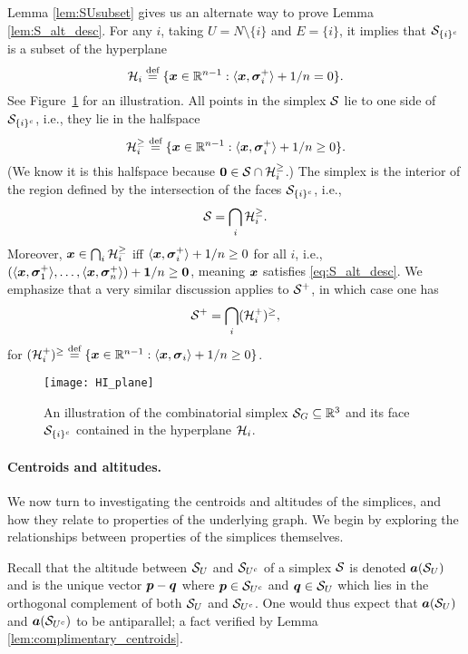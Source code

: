 Lemma \ref{lem:SUsubset} gives us an alternate way to prove Lemma \ref{lem:S_alt_desc}. For any $i$,  taking $U=N\setminus \{i\}$ and $E=\{i\}$, it implies that $\mathcal{S}_{\{i\}^c}$ is a subset of the hyperplane 
\begin{equation}
\label{eq:Hi}
 \mathcal{H}_i\overset{\text{def}}{=} \{\vb*{x}\in\mathbb{R}^{n-1}:\langle \vb*{x},\vb*{\sigma}_i^+\rangle+1/n=0\}.
\end{equation}
See Figure~\ref{fig:Hi_plane} for an illustration. 
All points in the simplex $\mathcal{S}$ lie to one side of $\mathcal{S}_{\{i\}^c}$, i.e., they lie in the halfspace 
\[\mathcal{H}_i^{\geq } \overset{\text{def}}{=} \{\vb*{x}\in\mathbb{R}^{n-1}:\langle \vb*{x},\vb*{\sigma}_i^+\rangle+1/n\geq0\}.\]
(We know it is this halfspace because $\vb{0}\in\mathcal{S}\cap\mathcal{H}_i^{\geq }$.) The simplex is the interior of the region defined by the intersection of the faces $\mathcal{S}_{\{i\}^c}$, i.e.,   
\begin{equation}
\label{eq:splx_bigcapH_i}
    \mathcal{S}=\bigcap_i \mathcal{H}_i^{\geq }.
\end{equation}
Moreover, $\vb*{x}\in \bigcap_i\mathcal{H}_i^{\geq }$ iff $\langle \vb*{x},\vb*{\sigma}_i^+\rangle +1/n\geq 0$ for all $i$, i.e., $(\langle \vb*{x},\vb*{\sigma}_1^+\rangle,\dots,\langle \vb*{x},\vb*{\sigma}_n^+\rangle) + \vb{1}/n\geq \vb{0}$, meaning $\vb*{x}$ satisfies \eqref{eq:S_alt_desc}.  We emphasize that a very similar discussion applies to $\mathcal{S}^+$, in which case one has 
\begin{equation}
\label{eq:splx^+_bigcapH_i}
\mathcal{S}^+=\bigcap_i (\mathcal{H}_i^+)^{\geq },
\end{equation}
for $(\mathcal{H}_i^+)^{\geq } \overset{\text{def}}{=} \{\vb*{x}\in\mathbb{R}^{n-1}:\langle \vb*{x},\vb*{\sigma}_i\rangle + 1/n\geq 0\}$. 

\begin{figure}
	\centering
	\texttt{[image: HI\_plane]}
	\caption{An illustration of the combinatorial simplex $\mathcal{S}_G\subseteq\mathbb{R}^3$ and its face $\mathcal{S}_{\{i\}^c}$ contained in the hyperplane $\mathcal{H}_i$. }
	\label{fig:Hi_plane}
\end{figure}


\paragraph{Centroids and altitudes.} 
We now turn to investigating the centroids and altitudes of the simplices, and how they relate to properties of the underlying graph. We begin by exploring the relationships between properties of the simplices themselves. 

Recall that the altitude between $\mathcal{S}_U$ and $\mathcal{S}_{U^c}$ of a simplex $\mathcal{S}$ is denoted $\vb*{a}(\mathcal{S}_U)$ and is the unique vector $\vb*{p}-\vb*{q}$ where  $\vb*{p}\in \mathcal{S}_{U^c}$ and $\vb*{q}\in\mathcal{S}_{U}$ which lies in the orthogonal complement of both $\mathcal{S}_U$ and $\mathcal{S}_{U^c}$. One would thus expect that $\vb*{a}(\mathcal{S}_U)$ and $\vb*{a}(\mathcal{S}_{U^c})$ to be antiparallel; a fact verified by Lemma \ref{lem:complimentary_centroids}.  

